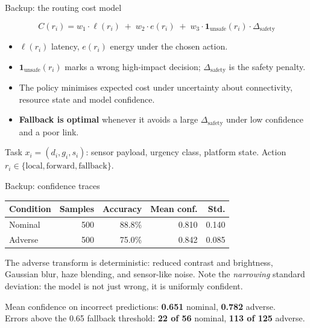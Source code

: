 \documentclass[aspectratio=169, 11pt]{beamer}
\newcommand{\shout}[1]{{\color{navy}\bfseries #1}}
\newcommand{\num}[1]{{\color{cblue}\bfseries #1}}
\begin{document}
\begin{frame}{Backup: the routing cost model}

\vspace{1.2em}
\begin{equation*}
  C(r_i) = w_1 \cdot \ell(r_i) \;+\; w_2 \cdot e(r_i) \;+\; w_3 \cdot \mathbf{1}_{\text{unsafe}}(r_i) \cdot \Delta_{\text{safety}}
\end{equation*}

\vspace{1.2em}
\begin{itemize}\setlength\itemsep{0.55em}
  \item $\ell(r_i)$ latency, $e(r_i)$ energy under the chosen action.
  \item $\mathbf{1}_{\text{unsafe}}(r_i)$ marks a wrong high-impact decision; $\Delta_{\text{safety}}$ is the safety penalty.
  \item The policy minimises expected cost under uncertainty about connectivity, resource state and model confidence.
  \item \shout{Fallback is optimal} whenever it avoids a large $\Delta_{\text{safety}}$ under low confidence and a poor link.
\end{itemize}

\vspace{1.0em}
{\color{ink2}\small Task $x_i = (d_i, g_i, s_i)$: sensor payload, urgency class, platform state. Action $r_i \in \{\text{local}, \text{forward}, \text{fallback}\}$.}
\end{frame}

\begin{frame}{Backup: confidence traces}

\vspace{1.2em}
\centering
{\large
\begin{tabular}{@{}lrrrr@{}}
\toprule
\textbf{\color{navy}Condition} & \textbf{\color{navy}Samples} & \textbf{\color{navy}Accuracy} & \textbf{\color{navy}Mean conf.} & \textbf{\color{navy}Std.} \\
\midrule
Nominal & 500 & 88.8\% & 0.810 & 0.140 \\
Adverse & 500 & 75.0\% & 0.842 & 0.085 \\
\bottomrule
\end{tabular}}

\vspace{1.6em}
\begin{minipage}{0.86\textwidth}
{\small The adverse transform is deterministic: reduced contrast and brightness, Gaussian blur, haze blending, and sensor-like noise. Note the \emph{narrowing} standard deviation: the model is not just wrong, it is uniformly confident.}

\vspace{0.9em}
{\small Mean confidence on incorrect predictions: \num{0.651} nominal, \num{0.782} adverse.\\
Errors above the 0.65 fallback threshold: \num{22 of 56} nominal, \num{113 of 125} adverse.}
\end{minipage}
\end{frame}
\end{document}
